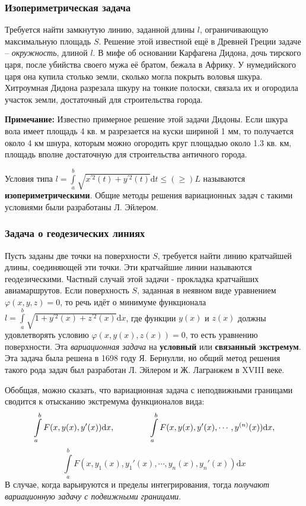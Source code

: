 \documentclass[12pt, a4paper]{article}
\newcommand{\di}{\mathrm{d}}
\begin{document}
\subsubsection{Изопериметрическая задача}

Требуется найти замкнутую линию, заданной длины $l$, ограничивающую максимальную площадь $S$. Решение этой известной ещё в Древней Греции задаче – \textit{окружность}, длиной $l$. В мифе об основании Карфагена Дидона, дочь тирского царя, после убийства своего мужа её братом, бежала в Африку. У нумедийского царя она купила столько земли, сколько могла покрыть воловья шкура. Хитроумная Дидона разрезала шкуру на тонкие полоски, связала их и огородила участок земли, достаточный для строительства города.

\begin{footnotesize}
\textbf{Примечание:} Известно примерное решение этой задачи Дидоны. Если шкура вола имеет площадь 4 кв. м разрезается на куски шириной 1 мм, то получается около 4 км шнура, которым можно огородить круг площадью около 1.3 кв. км, площадь вполне достаточную для строительства античного города.
\end{footnotesize}

Условия типа $l = \int \limits_a^b \sqrt{x^{\prime 2}(t) + y^{\prime 2}(t)} \di t \leq (\geq) L$ называются \textbf{изопериметрическими}. Общие методы решения вариационных задач с такими условиями были разработаны Л. Эйлером.

\subsubsection{Задача о геодезических линиях}

Пусть заданы две точки на поверхности $S$, требуется найти линию кратчайшей длины, соединяющей эти точки. Эти кратчайшие линии называются геодезическими. Частный случай этой задачи - прокладка кратчайших авиамаршрутов. Если поверхность $S$, заданная в неявном виде уравнением $\varphi (x, y, z) = 0$, то речь идёт о минимуме функционала $l = \int \limits_a^b \sqrt{1 + y^{\prime 2}(x) + z^{\prime 2}(x)} \di x$, где функции $y(x)$ и $z(x)$ должны удовлетворять условию $\varphi (x, y(x), z(x)) = 0$, то есть уравнению поверхности. Эта \textit{вариационная задача} на \textbf{условный} или \textbf{связанный экстремум}. Эта задача была решена в 1698 году Я. Бернулли, но общий метод решения такого рода задач был разработан Л. Эйлером и Ж. Лагранжем в XVIII веке.

Обобщая, можно сказать, что вариационная задача с неподвижными границами сводится к отысканию экстремума функционалов вида:
\[\int \limits_a^b F(x, y(x), y'(x)) \di x, \hspace{15mm} \int \limits_a^b F(x, y(x), y'(x), \cdots, y^{(n)}(x)) \di x, \]
\[\int \limits_a^b F(x, y_1(x), y_{1}'(x), \cdots, y_n(x), y_{n}'(x)) \di x \]
В случае, когда варьируются и пределы интегрирования, тогда \textit{получают вариационную задачу с подвижными границами}.
\end{document}
